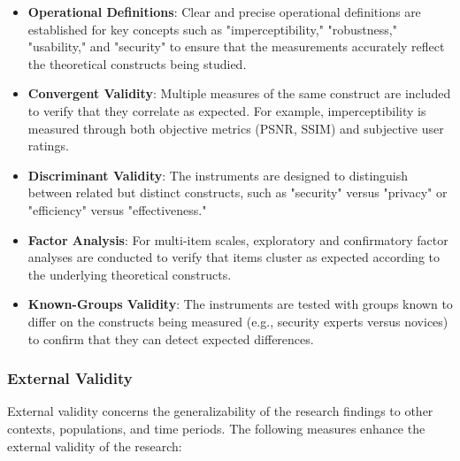 \documentclass[12pt, a4paper, oneside]{book}
\begin{document}
\begin{itemize}[leftmargin=*]
    \item \textbf{Operational Definitions}: Clear and precise operational definitions are established for key concepts such as "imperceptibility," "robustness," "usability," and "security" to ensure that the measurements accurately reflect the theoretical constructs being studied.

    \item \textbf{Convergent Validity}: Multiple measures of the same construct are included to verify that they correlate as expected. For example, imperceptibility is measured through both objective metrics (PSNR, SSIM) and subjective user ratings.

    \item \textbf{Discriminant Validity}: The instruments are designed to distinguish between related but distinct constructs, such as "security" versus "privacy" or "efficiency" versus "effectiveness."

    \item \textbf{Factor Analysis}: For multi-item scales, exploratory and confirmatory factor analyses are conducted to verify that items cluster as expected according to the underlying theoretical constructs.

    \item \textbf{Known-Groups Validity}: The instruments are tested with groups known to differ on the constructs being measured (e.g., security experts versus novices) to confirm that they can detect expected differences.
\end{itemize}

\subsubsection{External Validity}
External validity concerns the generalizability of the research findings to other contexts, populations, and time periods. The following measures enhance the external validity of the research:
\end{document}
